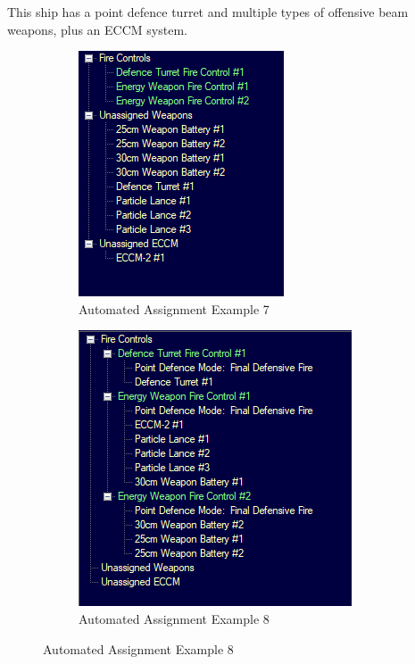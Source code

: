 \documentclass[../../Aurora C# unofficial manual.tex]{subfiles}
\begin{document}
	This ship has a point defence turret and multiple types of offensive beam weapons, plus an ECCM system.
	\begin{figure}[H]
		\centering
		\begin{subfigure}{.5\textwidth}
			\centering
			\includegraphics[width=0.5\linewidth]{images/AutomatedAssignment7}
			\caption[Automated Assignment]{Automated Assignment Example 7}
			\label{fig:automatedassignment7}
		\end{subfigure}%
		\begin{subfigure}{.5\textwidth}
			\centering
			\includegraphics[width=0.5\linewidth]{images/AutomatedAssignment8}
			\caption[Automated Assignment]{Automated Assignment Example 8}
			\label{fig:automatedassignment8}
		\end{subfigure}
	\end{figure}
	
\end{document}
